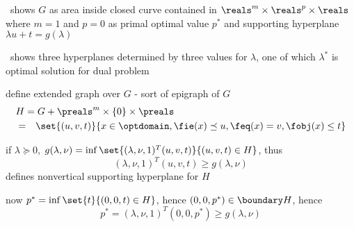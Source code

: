 \documentclass[17pt,landscape]{foils}
\begin{document}
{\def\dualitygraphunitsize{1em}

\bit
\item
	\
	shows $G$ as area inside closed curve
	contained in $\reals^m\times\reals^p\times\reals$ where $m=1$ and $p=0$
	as primal optimal value $p^\ast$ and supporting hyperplane
	$\lambda u + t = g(\lambda)$
\eit

\begin{figure}
\begin{center}
	\dualitygraphone{\dualitygraphunitsize}
	\label{fig:geometric interpretation of duality - 1}
\end{center}
\end{figure}

\bit
\item
	\
	shows three hyperplanes determined by three values for $\lambda$,
	one of which $\lambda^\ast$ is optimal solution for dual problem
\eit

\begin{figure}
\begin{center}
	\dualitygraphtwo{\dualitygraphunitsize}
	\label{fig:geometric interpretation of duality - 2}
\end{center}
\end{figure}



\bit
\item
	define extended graph over $G$ - sort of epigraph of $G$
	\begin{eqnarray*}
	\lefteqn{
		H = G + \preals^m \times \{0\} \times \preals
	}
	\\
	&
	=
	&
		\set{(u, v, t)}{x\in\optdomain, \fie(x) \preceq u, \feq(x) = v, \fobj(x)\leq t }
	\end{eqnarray*}

\item if $\lambda\succeq 0$, $g(\lambda,\nu) = \inf\set{(\lambda,\nu,1)^T(u,v,t)}{(u,v,t) \in H}$, thus
	$$
		(\lambda,\nu,1)^T (u,v,t) \geq g(\lambda,\nu)
	$$
	defines nonvertical supporting hyperplane for $H$

\item
	now $p^\ast = \inf\set{t}{(0,0,t)\in H}$, hence $(0,0,p^\ast) \in \boundary H$, hence
	$$
		p^\ast =(\lambda,\nu,1)^T (0,0,p^\ast) \geq g(\lambda,\nu)
	$$

}
\end{document}
